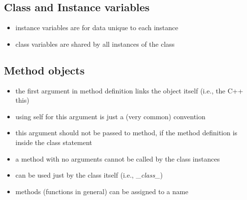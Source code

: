 \documentclass[11pt]{article}
\providecommand{\tightlist}{%
      \setlength{\itemsep}{0pt}\setlength{\parskip}{0pt}}
\begin{document}
    \hypertarget{class-and-instance-variables}{%
\subsection{Class and Instance
variables}\label{class-and-instance-variables}}

\begin{itemize}
\tightlist
\item
  instance variables are for data unique to each instance
\item
  class variables are shared by all instances of the class
\end{itemize}

\hypertarget{method-objects}{%
\subsection{Method objects}\label{method-objects}}

\begin{itemize}
\tightlist
\item
  the first argument in method definition links the object itself (i.e.,
  the C++ this)
\item
  using self for this argument is just a (very common) convention
\item
  this argument should not be passed to method, if the method definition
  is inside the class statement
\item
  a method with no arguments cannot be called by the class instances
\item
  can be used just by the class itself (i.e., \_\emph{class\_})
\item
  methods (functions in general) can be assigned to a name
\end{itemize}
\end{document}
